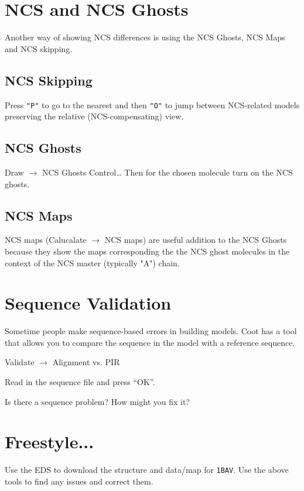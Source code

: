 \documentclass{article}
\begin{document}
\section{NCS and NCS Ghosts}

   Another way of showing NCS differences is using the NCS Ghosts, NCS
   Maps and NCS skipping.  

\subsection{NCS Skipping}

Press \texttt{"P"} to go to the nearest and then \texttt{"O"} to jump
between NCS-related models preserving the relative (NCS-compensating)
view.

\subsection{NCS Ghosts}

\textsf{Draw $\rightarrow$ NCS Ghosts Control\ldots} Then for the
chosen molecule turn on the NCS ghosts.

\subsection{NCS Maps}

NCS maps (\textsf{Calucalate $\rightarrow$ NCS maps}) are useful
addition to the NCS Ghosts because they show the maps corresponding
the the NCS ghost molecules in the context of the NCS master
(typically "A") chain.

 
\section{Sequence Validation}

Sometime people make sequence-based errors in building models.  Coot
has a tool that allows you to compare the sequence in the model with a
reference sequence.

\textsf{Validate $\rightarrow$ Alignment vs. PIR}

Read in the sequence file and press ``OK''.

Is there a sequence problem?  How might you fix it?

\section{Freestyle...}

Use the EDS to download the structure and data/map for \texttt{1BAV}.
Use the above tools to find any issues and correct them.
\end{document}

